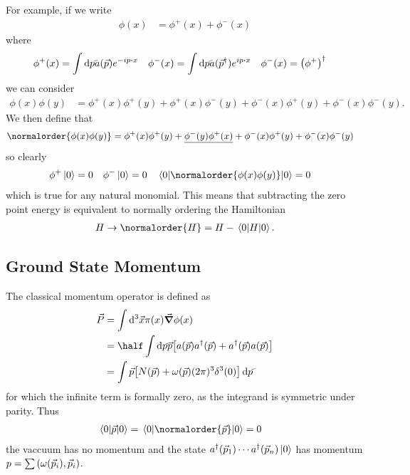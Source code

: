 \documentclass[notes.tex]{subfiles}
\begin{document}
For example, if we write 
\begin{align*}
    \phi(x) &= \phi^+(x) + \phi^-(x)
\end{align*}
where
\begin{align*}
    \phi^+(x) &= \int \dds{p} a(\vec{p})e^{-ip\vdot{x}}&
    \phi^-(x) &= \int \dds{p} a(\vec{p}^\dagger)e^{ip\vdot{x}}&
    \phi^-(x) &= \qty(\phi^+)^\dagger
\end{align*}
we can consider
\begin{align*}
    \phi(x)\phi(y) &= \phi^+(x)\phi^+(y) + \phi^+(x)\phi^-(y) + \phi^-(x)\phi^+(y) + \phi^-(x)\phi^-(y).
\end{align*}
We then define that
\begin{align*}
    \normalorder{\phi(x)\phi(y)} &= \phi^+(x)\phi^+(y) + \underline{\phi^-(y)\phi^+(x)} + \phi^-(x)\phi^+(y) + \phi^-(x)\phi^-(y)
\end{align*}
so clearly
\begin{align*}
    \phi^+\ket{0} &= 0 & \phi^-\ket{0} &= 0 & \mel{0}{\normalorder{\phi(x)\phi(y)}}{0} &= 0
\end{align*} 
which is true for any natural monomial.
This means that subtracting the zero point energy is equivalent to normally ordering the Hamiltonian
\begin{align*}
    H \to \normalorder{H} = H - \mel{0}{H}{0}.
\end{align*}

\subsection{Ground State Momentum}
The classical momentum operator is defined as
\begin{align*}
    \vec{P} &= \int \dd[3]\vec{x} \pi(x)\grad{\phi}(x)\\
    &= \half\int\dds{p} \vec{p} \qty[a(\vec{p})a^\dagger(\vec{p}) + a^\dagger(\vec{p}) a(\vec{p})]\\
    &= \int \vec{p}\qty[N(\vec{p}) + \omega(\vec{p})(2\pi)^3 \delta^3(0)] \,\dds{p} 
\end{align*}
for which the infinite term is formally zero, as the integrand is symmetric under parity. 
Thus
\begin{align*}
    \mel{0}{\vec{p}}{0} &= \mel{0}{\normalorder{\vec{p}}}{0} = 0
\end{align*}
\ie{}the vaccuum has no momentum and the state $a^\dagger(\vec{p}_1)\cdots a^\dagger(\vec{p}_n)\ket{0}$ has momentum $p = \sum\qty(\omega(\vec{p}_i), \vec{p}_i)$.
\end{document}
